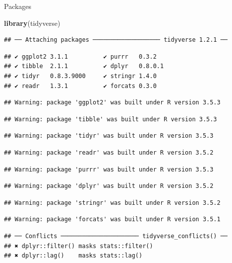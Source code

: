 \documentclass[ignorenonframetext,]{beamer}
\newenvironment{Shaded}{\begin{snugshade}}{\end{snugshade}}
\newcommand{\KeywordTok}[1]{\textcolor[rgb]{0.13,0.29,0.53}{\textbf{#1}}}
\newcommand{\NormalTok}[1]{#1}
\begin{document}
\begin{frame}[fragile]{Packages}
\protect\hypertarget{packages-11}{}

\begin{Shaded}
\begin{Highlighting}[]
\KeywordTok{library}\NormalTok{(tidyverse)}
\end{Highlighting}
\end{Shaded}

\begin{verbatim}
## ── Attaching packages ─────────────────── tidyverse 1.2.1 ──
\end{verbatim}

\begin{verbatim}
## ✔ ggplot2 3.1.1          ✔ purrr   0.3.2     
## ✔ tibble  2.1.1          ✔ dplyr   0.8.0.1   
## ✔ tidyr   0.8.3.9000     ✔ stringr 1.4.0     
## ✔ readr   1.3.1          ✔ forcats 0.3.0
\end{verbatim}

\begin{verbatim}
## Warning: package 'ggplot2' was built under R version 3.5.3
\end{verbatim}

\begin{verbatim}
## Warning: package 'tibble' was built under R version 3.5.3
\end{verbatim}

\begin{verbatim}
## Warning: package 'tidyr' was built under R version 3.5.3
\end{verbatim}

\begin{verbatim}
## Warning: package 'readr' was built under R version 3.5.2
\end{verbatim}

\begin{verbatim}
## Warning: package 'purrr' was built under R version 3.5.3
\end{verbatim}

\begin{verbatim}
## Warning: package 'dplyr' was built under R version 3.5.2
\end{verbatim}

\begin{verbatim}
## Warning: package 'stringr' was built under R version 3.5.2
\end{verbatim}

\begin{verbatim}
## Warning: package 'forcats' was built under R version 3.5.1
\end{verbatim}

\begin{verbatim}
## ── Conflicts ────────────────────── tidyverse_conflicts() ──
## ✖ dplyr::filter() masks stats::filter()
## ✖ dplyr::lag()    masks stats::lag()
\end{verbatim}

\end{frame}
\end{document}
